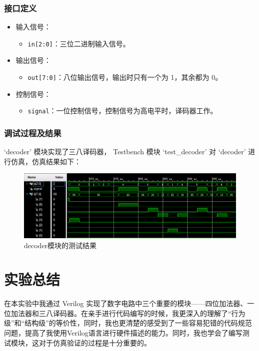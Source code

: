 \documentclass[zihao=5, UTF8]{article}
\theoremstyle{MyLineTheoremStyle} %
\theoremstyle{MyBlockTheoremStyle} %
\theoremstyle{MySubsubsectionStyle} %
\begin{document}
\subsubsection{接口定义}
\begin{itemize}
    \item 输入信号：
    \begin{itemize}
        \item \texttt{in[2:0]}：三位二进制输入信号。
    \end{itemize}
    \item 输出信号：
    \begin{itemize}
        \item \texttt{out[7:0]}：八位输出信号，输出时只有一个为 1，其余都为 0。
    \end{itemize}
        \item 控制信号：
    \begin{itemize}
        \item \texttt{signal}：一位控制信号，控制信号为高电平时，译码器工作。
    \end{itemize}
\end{itemize}
\subsubsection{调试过程及结果}
`decoder' 模块实现了三八译码器， Testbench 模块 `test\_decoder' 对 `decoder' 进行仿真，仿真结果如下：
\begin{figure}[htbp]
    \centering
    \includegraphics[width=\textwidth]{decoder.png} %
    \caption{decoder模块的测试结果}
    \label{fig:decoder模块的测试结果}
\end{figure}


\section{实验总结}
在本实验中我通过 Verilog 实现了数字电路中三个重要的模块——四位加法器、一位加法器和三八译码器。在亲手进行代码编写的时候，我更深入的理解了“行为级”和“结构级”的等价性，同时，我也更清楚的感受到了一些容易犯错的代码规范问题，提高了我使用Verilog语言进行硬件描述的能力。同时，我也学会了编写测试模块，这对于仿真验证的过程是十分重要的。
\end{document}
